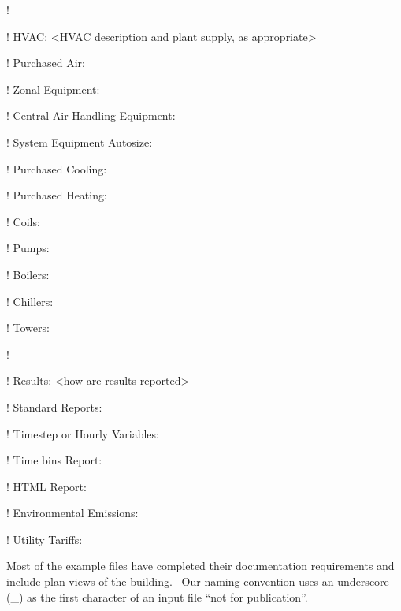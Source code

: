 !

! HVAC: \textless{}HVAC description and plant supply, as appropriate\textgreater{}

! Purchased Air:

! Zonal Equipment:

! Central Air Handling Equipment:

! System Equipment Autosize:

! Purchased Cooling:

! Purchased Heating:

! Coils:

! Pumps:

! Boilers:

! Chillers:

! Towers:

!

! Results: \textless{}how are results reported\textgreater{}

! Standard Reports:

! Timestep or Hourly Variables:

! Time bins Report:

! HTML Report:

! Environmental Emissions:

! Utility Tariffs:

Most of the example files have completed their documentation requirements and include plan views of the building.~ Our naming convention uses an underscore (\_) as the first character of an input file ``not for publication''.

